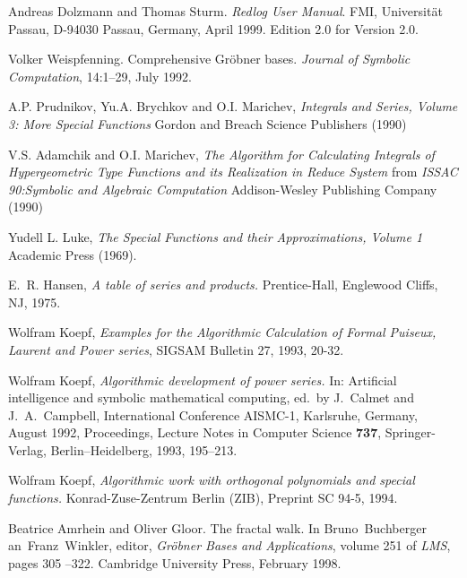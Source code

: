 \begin{thebibliography}{999}
Andreas Dolzmann and Thomas Sturm.
\newblock \emph{Redlog User Manual}.
\newblock FMI, Universit\"at Passau, D-94030 Passau, Germany, April 1999.
\newblock Edition 2.0 for Version 2.0.

Volker Weispfenning.
\newblock Comprehensive {G}r\"obner bases.
\newblock \emph{Journal of Symbolic Computation}, 14:1--29, July 1992.


 A.P. Prudnikov, Yu.A. Brychkov and O.I. Marichev,
\emph{Integrals and Series, Volume 3: More Special Functions} Gordon 
and Breach Science Publishers (1990)

 V.S. Adamchik and O.I. Marichev, \emph{The 
Algorithm for Calculating Integrals of Hypergeometric Type Functions 
and its Realization in Reduce System} from \emph{ISSAC 90:Symbolic and 
Algebraic Computation} Addison-Wesley Publishing Company (1990) 

 Yudell L. Luke, \emph{The Special Functions and their
Approximations, Volume 1} Academic Press (1969).


E.\ R. Hansen, {\em A table of series and products.}
Prentice-Hall, Englewood Cliffs, NJ, 1975.


 Wolfram Koepf,
{\em Examples for the Algorithmic Calculation of Formal
Puiseux, Laurent and Power series},
SIGSAM Bulletin 27, 1993, 20-32.

 Wolfram Koepf,
{\em Algorithmic development of power series.} In:
Artificial intelligence and symbolic mathematical computing,
ed.\ by J.\ Calmet and J.\ A.\ Campbell,
International Conference AISMC-1, Karlsruhe, Germany, August 1992, Proceedings,
Lecture Notes in Computer Science \textbf{737}, Springer-Verlag,
Berlin--Heidelberg, 1993, 195--213.

 Wolfram Koepf,
{\em Algorithmic work with orthogonal polynomials and special functions.}
Konrad-Zuse-Zentrum Berlin (ZIB), Preprint SC 94-5, 1994.


Beatrice Amrhein and Oliver Gloor.
\newblock The fractal walk.
\newblock In Bruno~Buchberger an~Franz~Winkler, editor, {\em Gr\"obner Bases
  and Applications}, volume 251 of {\em LMS}, pages 305 --322. Cambridge
  University Press, February 1998.


\end{thebibliography}
